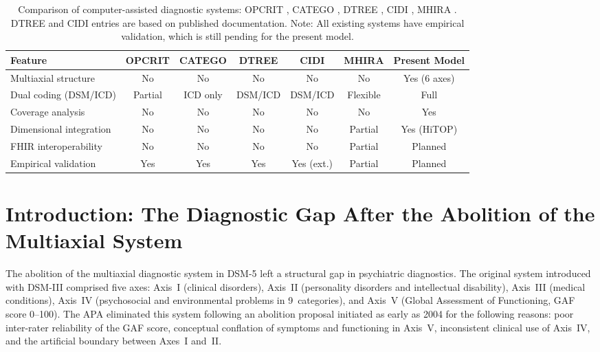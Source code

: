 \documentclass[11pt,a4paper]{article}
\begin{document}
\begin{table}[ht]
\centering
\caption{Comparison of computer-assisted diagnostic systems: OPCRIT \citep{McGuffin1991}, CATEGO \citep{Wing1974}, DTREE \citep{First1993}, CIDI \citep{Kessler2004}, MHIRA \citep{Stasiak2023}. DTREE and CIDI entries are based on published documentation. Note: All existing systems have empirical validation, which is still pending for the present model.}
\footnotesize
\begin{tabularx}{\textwidth}{@{}Y *{6}{C}@{}}
\toprule
Feature & OPCRIT & CATEGO & DTREE & CIDI & MHIRA & Present Model \\
\midrule
Multiaxial structure & No & No & No & No & No & Yes (6 axes) \\
Dual coding (DSM/ICD) & Partial & ICD only & DSM/ICD & DSM/ICD & Flexible & Full \\
Coverage analysis & No & No & No & No & No & Yes \\
Dimensional integration & No & No & No & No & Partial & Yes (HiTOP) \\
FHIR interoperability & No & No & No & No & Partial & Planned \\
Empirical validation & Yes & Yes & Yes & Yes (ext.) & Partial & Planned \\
\bottomrule
\end{tabularx}
\normalsize
\label{tab:comparison}
\end{table}

\newpage


\section{Introduction: The Diagnostic Gap After the Abolition of the Multiaxial System}
\label{sec:introduction}

The abolition of the multiaxial diagnostic system in DSM-5 \citep{APA2013} left a structural gap in psychiatric diagnostics. The original system introduced with DSM-III \citep{APA1980DSM3} comprised five axes: Axis~I (clinical disorders), Axis~II (personality disorders and intellectual disability), Axis~III (medical conditions), Axis~IV (psychosocial and environmental problems in 9~categories), and Axis~V (Global Assessment of Functioning, GAF score 0--100). The APA eliminated this system following an abolition proposal initiated as early as 2004 for the following reasons: poor inter-rater reliability of the GAF score, conceptual conflation of symptoms and functioning in Axis~V, inconsistent clinical use of Axis~IV, and the artificial boundary between Axes~I and~II.
\end{document}
